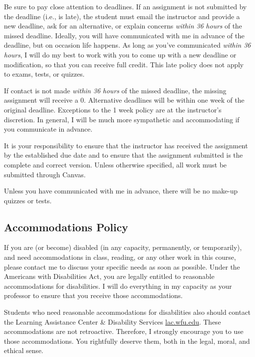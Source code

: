 \documentclass[11pt,]{article}
\begin{document}
Be sure to pay close attention to deadlines. If an assignment is not
submitted by the deadline (i.e., is late), the student must email the
instructor and provide a new deadline, ask for an alternative, or
explain concerns \emph{within 36 hours} of the missed deadline. Ideally,
you will have communicated with me in advance of the deadline, but on
occasion life happens. As long as you've communicated \emph{within 36
hours}, I will do my best to work with you to come up with a new
deadline or modification, so that you can receive full credit. This late
policy does not apply to exams, tests, or quizzes.

If contact is not made \emph{within 36 hours} of the missed deadline,
the missing assignment will receive a 0. Alternative deadlines will be
within one week of the original deadline. Exceptions to the 1 week
policy are at the instructor's discretion. In general, I will be much
more sympathetic and accommodating if you communicate in advance.

It is your responsibility to ensure that the instructor has received the
assignment by the established due date and to ensure that the assignment
submitted is the complete and correct version. Unless otherwise
specified, all work must be submitted through Canvas.

Unless you have communicated with me in advance, there will be no
make-up quizzes or tests.

\hypertarget{accommodations-policy}{%
\subsection{Accommodations Policy}\label{accommodations-policy}}

If you are (or become) disabled (in any capacity, permanently, or
temporarily), and need accommodations in class, reading, or any other
work in this course, please contact me to discuss your specific needs as
soon as possible. Under the Americans with Disabilities Act, you are
legally entitled to reasonable accommodations for disabilities. I will
do everything in my capacity as your professor to ensure that you
receive those accommodations.

Students who need reasonable accommodations for disabilities also should
contact the Learning Assistance Center \& Disability Services
\href{https://lac.wfu.edu/}{lac.wfu.edu}. These accommodations are not
retroactive. Therefore, I strongly encourage you to use those
accommodations. You rightfully deserve them, both in the legal, moral,
and ethical sense.
\end{document}
